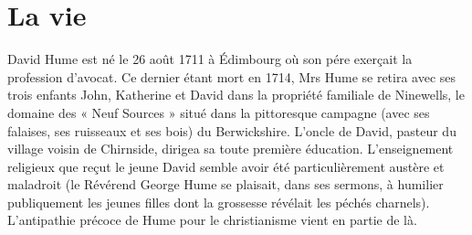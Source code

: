 
\chapter{La vie}

David Hume est né le 26 août 1711 à Édimbourg
où son pére exerçait la profession d’avocat. Ce
dernier étant mort en 1714, Mrs Hume se retira
avec ses trois enfants John, Katherine et David
dans la propriété familiale de Ninewells, le domaine
des « Neuf Sources » situé dans la pittoresque campagne
(avec ses falaises, ses ruisseaux et ses bois)
du Berwickshire. L’oncle de David, pasteur du
village voisin de Chirnside, dirigea sa toute première
éducation. L’enseignement religieux que reçut le
jeune David semble avoir été particulièrement
austère et maladroit (le Révérend George Hume
se plaisait, dans ses sermons, à humilier publiquement
les jeunes filles dont la grossesse révélait les
péchés charnels). L’antipathie précoce de Hume
pour le christianisme vient en partie de là.

